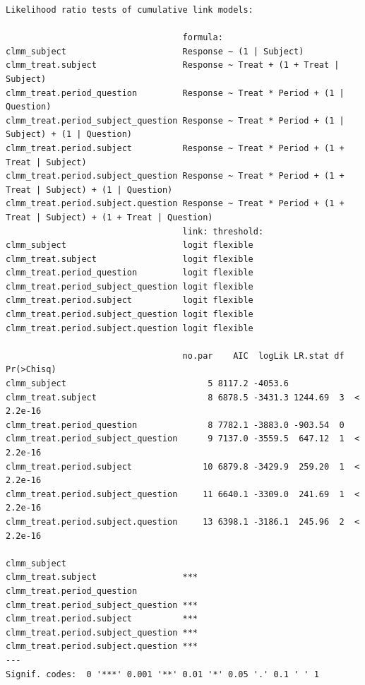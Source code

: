 \documentclass[
  12pt,
  a4paper,
  extrafontsizes,
  onecolumn,
  openright]{memoir}
\begin{document}
\begin{verbatim}
Likelihood ratio tests of cumulative link models:
 
                                   formula:                                                                  
clmm_subject                       Response ~ (1 | Subject)                                                  
clmm_treat.subject                 Response ~ Treat + (1 + Treat | Subject)                                  
clmm_treat.period_question         Response ~ Treat * Period + (1 | Question)                                
clmm_treat.period_subject_question Response ~ Treat * Period + (1 | Subject) + (1 | Question)                
clmm_treat.period.subject          Response ~ Treat * Period + (1 + Treat | Subject)                         
clmm_treat.period.subject_question Response ~ Treat * Period + (1 + Treat | Subject) + (1 | Question)        
clmm_treat.period.subject.question Response ~ Treat * Period + (1 + Treat | Subject) + (1 + Treat | Question)
                                   link: threshold:
clmm_subject                       logit flexible  
clmm_treat.subject                 logit flexible  
clmm_treat.period_question         logit flexible  
clmm_treat.period_subject_question logit flexible  
clmm_treat.period.subject          logit flexible  
clmm_treat.period.subject_question logit flexible  
clmm_treat.period.subject.question logit flexible  

                                   no.par    AIC  logLik LR.stat df Pr(>Chisq)
clmm_subject                            5 8117.2 -4053.6                      
clmm_treat.subject                      8 6878.5 -3431.3 1244.69  3  < 2.2e-16
clmm_treat.period_question              8 7782.1 -3883.0 -903.54  0           
clmm_treat.period_subject_question      9 7137.0 -3559.5  647.12  1  < 2.2e-16
clmm_treat.period.subject              10 6879.8 -3429.9  259.20  1  < 2.2e-16
clmm_treat.period.subject_question     11 6640.1 -3309.0  241.69  1  < 2.2e-16
clmm_treat.period.subject.question     13 6398.1 -3186.1  245.96  2  < 2.2e-16
                                      
clmm_subject                          
clmm_treat.subject                 ***
clmm_treat.period_question            
clmm_treat.period_subject_question ***
clmm_treat.period.subject          ***
clmm_treat.period.subject_question ***
clmm_treat.period.subject.question ***
---
Signif. codes:  0 '***' 0.001 '**' 0.01 '*' 0.05 '.' 0.1 ' ' 1
\end{verbatim}
\end{document}
